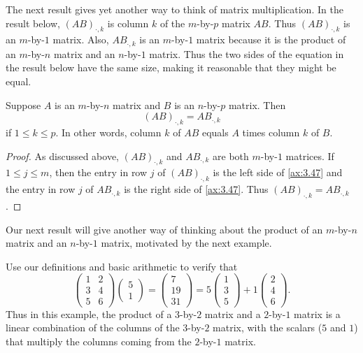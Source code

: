 The next result gives yet another way to think of matrix multiplication. In the
result below, $(AB)_{\cdot,k}$ is column $k$ of the $m$-by-$p$ matrix $AB$.
Thus $(AB)_{\cdot,k}$ is an $m$-by-$1$ matrix. Also, $AB_{\cdot,k}$ is an
$m$-by-$1$ matrix because it is the product of an $m$-by-$n$ matrix and an
$n$-by-$1$ matrix. Thus the two sides of the equation in the result below have
the same size, making it reasonable that they might be equal.

\begin{result}\label{ax:3.48}
Suppose $A$ is an $m$-by-$n$ matrix and $B$ is an $n$-by-$p$ matrix. Then
\[ (AB)_{\cdot,k} = AB_{\cdot,k} \]
if $1\le k\le p$. In other words, column $k$ of $AB$ equals $A$ times column
$k$ of $B$.
\end{result}

\begin{proof}
As discussed above, $(AB)_{\cdot,k}$ and $AB_{\cdot,k}$ are both $m$-by-$1$
matrices. If $1\le j\le m$, then the entry in row $j$ of $(AB)_{\cdot,k}$ is
the left side of \ref{ax:3.47} and the entry in row $j$ of $AB_{\cdot,k}$ is
the right side of \ref{ax:3.47}. Thus $(AB)_{\cdot,k}=AB_{\cdot,k}$.
\end{proof}

Our next result will give another way of thinking about the product of an
$m$-by-$n$ matrix and an $n$-by-$1$ matrix, motivated by the next example.

\begin{example}\label{ax:3.49}
Use our definitions and basic arithmetic to verify that
\[ \begin{pmatrix} 1 & 2\\ 3 & 4\\ 5 & 6 \end{pmatrix}
   \begin{pmatrix} 5\\ 1 \end{pmatrix}
 = \begin{pmatrix} 7\\ 19\\ 31 \end{pmatrix}
 = 5\begin{pmatrix} 1\\ 3\\ 5 \end{pmatrix}
   + 1\begin{pmatrix} 2\\ 4\\ 6 \end{pmatrix}. \]
Thus in this example, the product of a $3$-by-$2$ matrix and a $2$-by-$1$
matrix is a linear combination of the columns of the $3$-by-$2$ matrix, with
the scalars ($5$ and $1$) that multiply the columns coming from the $2$-by-$1$
matrix.
\end{example}

